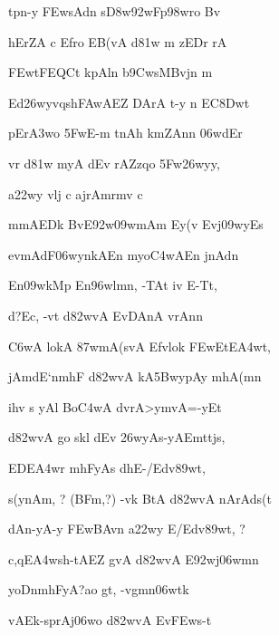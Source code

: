 {\dn tpn-y \3FEwsAd\?n s\3D8w\392wFp\?\398wro Bv\? \dontdisplaylinenum}

{\dn hErZA c Efro EB(vA d\381w\2 m\? zEDr\2 rA \vegdn\dontdisplaylinenum}

{\dn \3FEwtFEQCt\2 kpAl\?n b\5\39CwsMBvj\?n m\?{\dandabdn} \dontdisplaylinenum}

{\dn Ed\326wyvq\0sh\3FAwAEZ DArA t-y n EC\38Dwt\? \vegdn\dontdisplaylinenum}

{\dn pEr\3A3wo \35FwE-m t\?nAh\2 km\0ZAn\?n \306wdEr{\dandabdn} \dontdisplaylinenum}

{\dn vr\2 d\381w\2 myA d\?Ev rAZzqo \35Fw\326wyy, \vegdn\dontdisplaylinenum}

{\dn a\322wy\2 vlj{\rdt} c ajrAmrm\?v c{\dandabdn} \dontdisplaylinenum}

{\dn mmAEDk\2 Bv\?E\392w\309wmA\0m Ey(v Evj\?\309wyEs \vegdn\dontdisplaylinenum}

{\dn evmAdF\306wyn\?kAEn myo\3C4wAEn jnAd\0n\?{\dandabdn} \dontdisplaylinenum}

{\dn En\309wkMp En\396wlmn, -TAt iv E-Tt, \vegdn\dontdisplaylinenum}

{\dn d{\rs ?\re}Ec, -vt\2 d\382wvA EvDAnA\2 vrAnn\?{\dandabdn} \dontdisplaylinenum}

{\dn {}\3C6wA lokA \387wmA(svA\0 Efvlok\? \3FEwEtE\3A4wt, \vegdn\dontdisplaylinenum}

{\dn jAmdE`nm\0hF{\qva} d\382wvA kA\35BwypAy mhA(mn\?{\dandabdn} \dontdisplaylinenum}

{\dn ih\4v s yAl\2 Bo\3C4wA d\?vrA>ymvA=-yEt \vegdn\dontdisplaylinenum }

{\dn d\382wvA go skl\2 d\?Ev \326wyAs-yAEmtt\?js,{\dandabdn} \dontdisplaylinenum}

{\dn {}EDE\3A4wr mhFyAs d\?hE-/Edv\389wt, \vegdn\dontdisplaylinenum}

{\dn s(ynAm, {\rs ?\re} {\rs (\re}BFm,{\rs ?)\re} -vk\2 BtA\0 d\382wvA nArAds(t \dontdisplaylinenum}

{\dn dAn-yA-y \3FEwBAv\?n a\322wy\2 E/Edv\389wt, {\rs ?\re} \vegdn\dontdisplaylinenum}

{\dn c,qE\3A4wsh-tAEZ gvA\2 d\382wvA E\392wj\306wmn\?{\dandabdn} \dontdisplaylinenum}

{\dn {}yo{\qvb}DnmhFyA{\rs ?\re}ao gt, -vg\0mn\306wtk \vegdn\dontdisplaylinenum}

{\dn vAEk-sp\0rAj\?\306wo d\382wvA Ev\3FEws\2-t \dontdisplaylinenum}

